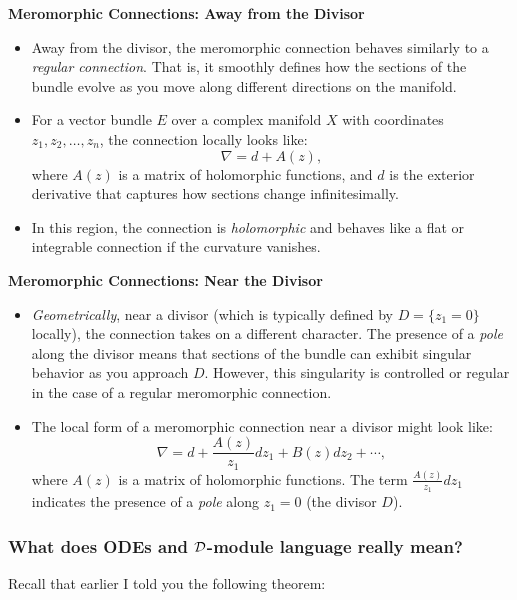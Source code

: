 \begin{remark}
	\textbf{Meromorphic Connections: Away from the Divisor}
	\begin{itemize}
		\item Away from the divisor, the meromorphic connection behaves similarly to a \textit{regular connection}. That is, it smoothly defines how the sections of the bundle evolve as you move along different directions on the manifold.

		\item For a vector bundle \( E \) over a complex manifold \( X \) with coordinates \( z_1, z_2, \dots, z_n \), the connection locally looks like:
		      \[
			      \nabla = d + A(z),
		      \]
		      where \( A(z) \) is a matrix of holomorphic functions, and \( d \) is the exterior derivative that captures how sections change infinitesimally.

		\item In this region, the connection is \textit{holomorphic} and behaves like a flat or integrable connection if the curvature vanishes.
	\end{itemize}

	\textbf{Meromorphic Connections: Near the Divisor}
	\begin{itemize}
		\item \textit{Geometrically}, near a divisor (which is typically defined by \( D = \{ z_1 = 0 \} \) locally), the connection takes on a different character. The presence of a \textit{pole} along the divisor means that sections of the bundle can exhibit singular behavior as you approach \( D \). However, this singularity is controlled or regular in the case of a regular meromorphic connection.

		\item The local form of a meromorphic connection near a divisor might look like:
		      \[
			      \nabla = d + \frac{A(z)}{z_1} dz_1 + B(z) dz_2 + \cdots,
		      \]
		      where \( A(z) \) is a matrix of holomorphic functions. The term \( \frac{A(z)}{z_1} dz_1 \) indicates the presence of a \textit{pole} along \( z_1 = 0 \) (the divisor \( D \)).
	\end{itemize}
\end{remark}

\subsubsection{What does ODEs and ${\mathcal{D}}$-module language really mean?}
Recall that earlier I told you the following theorem:

